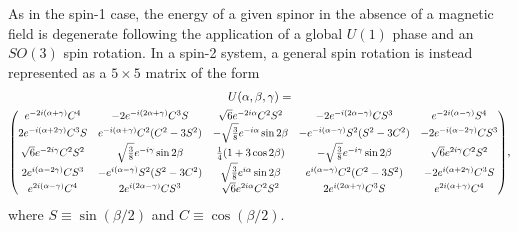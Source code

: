 As in the spin-1 case, the energy of a given spinor in the absence of a magnetic
field is degenerate following the application of a global \(U(1)\) phase and an
\(SO(3)\) spin rotation.
In a spin-2 system, a general spin rotation is instead represented as a
\(5\times 5\) matrix of the form~\cite{Kawaguchi2012}
\begin{multline}\label{eq: spin-2-rotation-matrix}
    U(\alpha, \beta, \gamma) = \\
    \scalemath{0.90}{\mqty(
    e^{-2i(\alpha + \gamma)}C^4 & -2e^{-i(2\alpha+\gamma)}C^3S
    & \sqrt{6}e^{-2i\alpha}C^2S^2 & -2e^{-i(2\alpha-\gamma)}CS^3
    & e^{-2i(\alpha - \gamma)}S^4
    \\
    2e^{-i(\alpha+2\gamma)}C^3S & e^{-i(\alpha+\gamma)}C^2(C^2-3S^2)
    & -\sqrt{\frac{3}{8}}e^{-i\alpha}\sin 2\beta
    & -e^{-i(\alpha-\gamma)}S^2(S^2-3C^2) & -2e^{-i(\alpha-2\gamma)}CS^3
    \\
    \sqrt{6}e^{-2i\gamma}C^2S^2 & \sqrt{\frac{3}{8}}e^{-i\gamma}\sin 2\beta
    & \frac{1}{4}(1+3\cos 2\beta)
    & -\sqrt{\frac{3}{8}}e^{-i\gamma}\sin 2\beta
    & \sqrt{6}e^{2i\gamma}C^2S^2
    \\
    2e^{i(\alpha-2\gamma)}CS^3 & -e^{i(\alpha-\gamma)}S^2(S^2-3C^2)
    & \sqrt{\frac{3}{8}}e^{i\alpha}\sin 2\beta
    & e^{i(\alpha-\gamma)}C^2(C^2-3S^2) & -2e^{i(\alpha+2\gamma)}C^3S
    \\
    e^{2i(\alpha - \gamma)}C^4 & 2e^{i(2\alpha-\gamma)}CS^3
    & \sqrt{6}e^{2i\alpha}C^2S^2 & 2e^{i(2\alpha+\gamma)}C^3S
    & e^{2i(\alpha + \gamma)}C^4
    )},
\end{multline}
where \(S \equiv \sin(\beta/2)\) and \(C \equiv \cos(\beta/2)\).

